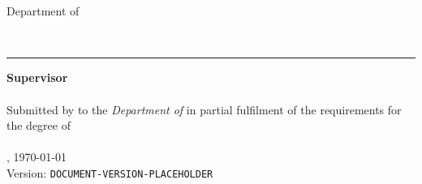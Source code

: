 \begin{titlepage}
    \begin{center}
        {\Large%
           \textsc{\university{}}%
        }
        \\\medskip
        {%
            \textbf{%
                \universityFaculty{}
            }\\
            Department of \universityDepartment{}%
        }
        \\\vfill
        {\Huge%
            \sffamily{%
                \textbf\documentTitle{}%
            }\par%
        }
        \medskip
        {\large%
            \textsl{%
                \documentSubtitle{}%
            }
        }
        \\\vfill
        {\Large%
            \textbf{\shortTitle{}}%
        }
    \end{center}
	\vfill
	\rule{\textwidth}{.4pt}
	\vfill
    \begin{flushleft}
        \textbf{Supervisor}\\
        \medskip
        \researchAdvisor{}\\
        \bigskip
        Submitted by \textbf{\documentAuthor{}} to the \textsl{Department of \universityDepartment{}} in partial fulfilment of the requirements for the degree of\\
        \textbf{\academicDegree{}}\\
        \medskip{}
        \documentPlace{}, \germanDate{}\today{}\\
        Version: \texttt{DOCUMENT-VERSION-PLACEHOLDER}\\
    \end{flushleft}
\end{titlepage}
